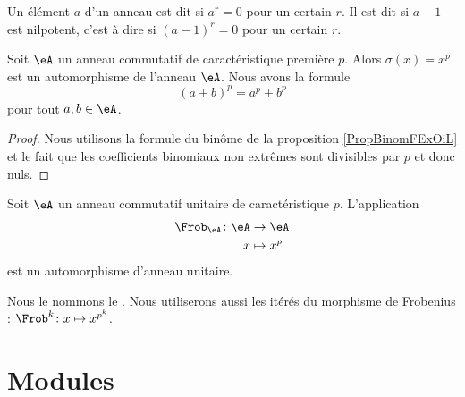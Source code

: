 \begin{definition}
    Un élément \( a\) d'un anneau est dit  si \( a^r=0\) pour un certain \( r\). Il est dit  si \( a-1\) est nilpotent, c'est à dire si \( (a-1)^r=0\) pour un certain \( r\).
\end{definition}

\begin{proposition}     \label{Propqrrdem}
    Soit \( \eA\) un anneau commutatif de caractéristique première \( p\). Alors \( \sigma(x)=x^p\) est un automorphisme de l'anneau \( \eA\). Nous avons la formule
    \begin{equation}
        (a+b)^p=a^p+b^p
    \end{equation}
    pour tout \( a,b\in \eA\).
\end{proposition}

\begin{proof}
    Nous utilisons la formule du binôme de la proposition \ref{PropBinomFExOiL} et le fait que les coefficients binomiaux non extrêmes sont divisibles par \( p\) et donc nuls.
\end{proof}

\begin{proposition} \label{PropFrobHAMkTY}
    Soit \( \eA\) un anneau commutatif unitaire de caractéristique \( p\). L'application
    \begin{equation}
        \begin{aligned}
            \Frob_\eA\colon \eA&\to \eA \\
            x&\mapsto x^p 
        \end{aligned}
    \end{equation}
    est un automorphisme d'anneau unitaire.
\end{proposition}
Nous le nommons le . Nous utiliserons aussi les itérés du morphisme de Frobenius : \( \Frob^k\colon x\mapsto x^{p^k}\).


\section{Modules}

